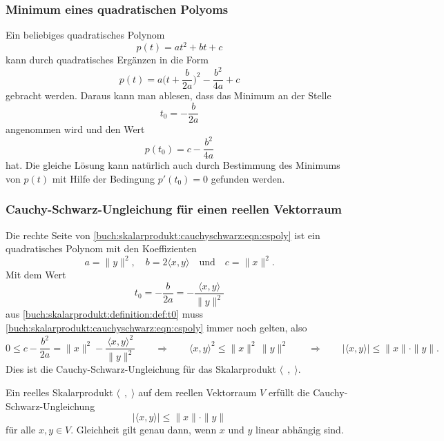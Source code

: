 %
%
\subsubsection{Minimum eines quadratischen Polyoms}
Ein beliebiges quadratisches Polynom
\[
p(t)=at^2+bt+c
\]
kann durch
quadratisches Ergänzen in die Form
\[
p(t)
=
a\biggl(t+\frac{b}{2a}\biggr)^2 -\frac{b^2}{4a}+c
\]
gebracht werden.
Daraus kann man ablesen, dass das Minimum an der Stelle
\begin{equation}
t_0
=
-\frac{b}{2a}
\label{buch:skalarprodukt:definition:def:t0}
\end{equation}
angenommen wird und den Wert 
\begin{equation}
p(t_0)
=
c-\frac{b^2}{4a}
\end{equation}
hat.
Die gleiche Lösung kann natürlich auch durch Bestimmung des Minimums
von $p(t)$ mit Hilfe der Bedingung $p'(t_0)=0$ gefunden werden.

%
%
\subsubsection{Cauchy-Schwarz-Ungleichung für einen reellen Vektorraum}
Die rechte Seite von
\eqref{buch:skalarprodukt:cauchyschwarz:eqn:cspoly}
ist ein quadratisches Polynom mit den Koeffizienten
\[
a=\|y\|^2,\quad
b=2\langle x,y\rangle
\quad\text{und}\quad
c=\|x\|^2.
\]
Mit dem Wert
\[
t_0
=
-\frac{b}{2a}
=
-\frac{\langle x,y\rangle}{\|y\|^2}
\]
aus \eqref{buch:skalarprodukt:definition:def:t0} muss
\eqref{buch:skalarprodukt:cauchyschwarz:eqn:cspoly}
immer noch gelten, also
\[
0
\le
c-\frac{b^2}{2a}
=
\|x\|^2 - \frac{\langle x,y\rangle^2}{\|y\|^2}
\qquad\Rightarrow\qquad
\langle x,y\rangle^2 \le \|x\|^2\, \|y\|^2
\qquad\Rightarrow\qquad
|\langle x,y\rangle| \le \|x\|\cdot \|y\|.
\]
Dies ist die Cauchy-Schwarz-Ungleichung für das Skalarprodukt
$\langle \;\,,\;\rangle$.

\begin{satz}
\label{buch:skalarprodukt:cauchy-schwarz:satz:reell}
Ein reelles Skalarprodukt $\langle\;\,,\;\rangle$ auf dem reellen Vektorraum
$V$ erfüllt die Cauchy-Schwarz-Ungleichung
\begin{equation}
|\langle x, y\rangle| \le \|x\|\cdot\|y\|
\label{buch:skalarprodukt:cauchyschwarz:eqn:ungleichung}
\end{equation}
für alle $x,y\in V$.
Gleichheit gilt genau dann, wenn $x$ und $y$ linear abhängig sind.
\end{satz}

